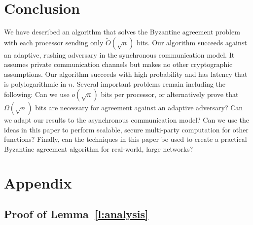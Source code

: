 \documentclass{sig-alternate}
\begin{document}
\section{Conclusion}
We have described an algorithm that solves the Byzantine agreement problem with each processor sending only $\tilde{O}(\sqrt{n})$ bits.  Our algorithm succeeds against an adaptive, rushing adversary in the synchronous communication model.  It assumes private communication channels but makes no other cryptographic assumptions.  Our algorithm succeeds with high probability and has latency that is polylogarithmic in $n$.  Several important problems remain including the following:  Can we use $o(\sqrt{n})$ bits per processor, or alternatively prove that $\Omega(\sqrt{n})$ bits are necessary for agreement against an adaptive adversary?  Can we adapt our results to the asynchronous communication model?  Can we use the ideas in this paper to perform scalable, secure multi-party computation for other functions?  Finally, can the techniques in this paper be used to create a practical Byzantine agreement algorithm for real-world, large networks?

\pagebreak


%


\appendix

\section{Appendix}

\subsection{Proof of Lemma~\ref{l:analysis}} \label{s:pf-analysis}
\end{document}

